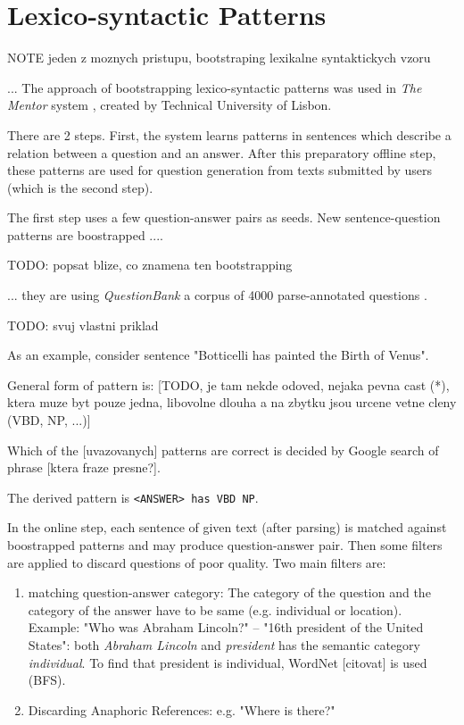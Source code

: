 \documentclass[a4paper, 12pt, twoside]{fithesis2}		%
\renewcommand{\_}{\leavevmode \kern0.07em\vbox{\hrule width0.4em}}
\begin{document}
\section{Lexico-syntactic Patterns}
\label{sec:lexico-syntactic-patterns}


NOTE jeden z moznych pristupu, bootstraping lexikalne syntaktickych vzoru

... The approach of bootstrapping lexico-syntactic patterns was used
in \textit{The Mentor} system \cite{mentor}, created by Technical University of Lisbon.

There are 2 steps.
First, the system learns patterns in sentences which describe a relation between a question and an answer.
After this preparatory offline step, these patterns are used for question generation from texts submitted by users (which is the second step).

The first step uses a few question-answer pairs as seeds.
New sentence-question patterns are boostrapped ....

TODO: popsat blize, co znamena ten bootstrapping

... they are using \textit{QuestionBank} a corpus of 4000 parse-annotated questions \cite{question-bank}.

TODO: svuj vlastni priklad

As an example, consider sentence "Botticelli has painted the Birth of Venus".

General form of pattern is: [TODO, je tam nekde odoved, nejaka pevna cast (*), ktera muze byt pouze jedna, libovolne dlouha a na zbytku jsou urcene vetne cleny (VBD, NP, ...)]

Which of the [uvazovanych] patterns are correct is decided by
Google search of phrase [ktera fraze presne?].

The derived pattern is \texttt{<ANSWER> has VBD NP}.



In the online step, each sentence of given text (after parsing) is matched against boostrapped patterns
and may produce question-answer pair.
Then some filters are applied to discard questions of poor quality. Two main filters are:

\begin{enumerate}
  \item matching question-answer category:
    The category of the question and the category of the answer have to be same (e.g. individual or location). Example: "Who was Abraham Lincoln?" -- "16th president of the United States": both \textit{Abraham Lincoln} and \textit{president} has the semantic category \textit{individual}.
    To find that president is individual, WordNet [citovat] is used (BFS).
  \item Discarding Anaphoric References: e.g. "Where is there?"
\end{enumerate}
\end{document}
